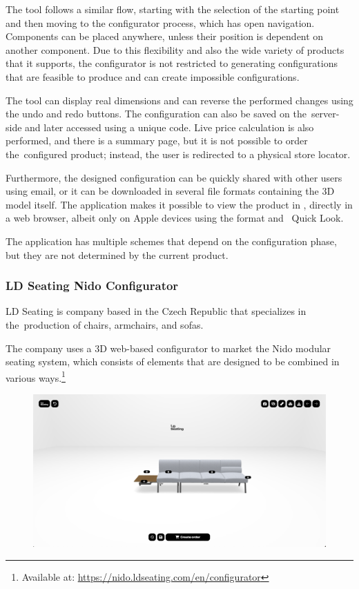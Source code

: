 The tool follows a similar flow, starting with the selection of the starting point and then moving to the configurator process, which has open navigation. Components can be placed anywhere, unless their position is dependent on another component. Due to this flexibility and also the wide variety of products that it supports, the configurator is not restricted to generating configurations that are feasible to produce and can create impossible configurations.

The tool can display real dimensions and can reverse the performed changes using the undo and redo buttons. The configuration can also be saved on the~server-side and later accessed using a unique code. Live price calculation is also performed, and there is a summary page, but it is not possible to order the~configured product; instead, the user is redirected to a physical store locator.

Furthermore, the designed configuration can be quickly shared with other users using email, or it can be downloaded in several file formats containing the 3D model itself. The application makes it possible to view the product in , directly in a web browser, albeit only on Apple devices using the  format and ~Quick Look.~\cite{Jackson2018}

The application has multiple  schemes that depend on the configuration phase, but they are not determined by the current product. 

\subsubsection{LD Seating Nido Configurator}

LD Seating is company based in the Czech Republic that specializes in the~production of chairs, armchairs, and sofas.~\cite{LDSeating}

The company uses a 3D web-based configurator to market the Nido modular seating system, which consists of elements that are designed to be combined in various ways.\footnote{Available at: \url{https://nido.ldseating.com/en/configurator}}~\cite{NidoConfigurator}

\begin{figure}[ht]
\centering
\includegraphics[width=\textwidth]{images/analysis_nido-configurator.png}
\end{figure}


